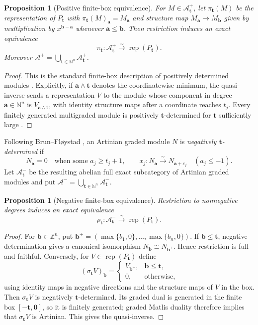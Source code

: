 \documentclass[12pt,reqno]{amsart}
\newtheorem{proposition}[theorem]{Proposition}
\theoremstyle{definition}
\theoremstyle{remark}
\newcommand{\Rep}{\operatorname{rep}}
\begin{document}
\begin{proposition}[Positive finite-box equivalence]\label{prop:positive-box}
For $M\in\mathcal A^+_{\mathbf t}$, let $\pi_{\mathbf t}(M)$ be the
representation of $P_{\mathbf t}$ with
$\pi_{\mathbf t}(M)_{\mathbf a}=M_{\mathbf a}$ and structure map
$M_{\mathbf a}\to M_{\mathbf b}$ given by multiplication by
$x^{\mathbf b-\mathbf a}$ whenever $\mathbf a\le\mathbf b$.
Then restriction induces an exact equivalence
\[
\pi_{\mathbf t}:\mathcal A^+_{\mathbf t}\xrightarrow{\sim}\Rep(P_{\mathbf t}).
\]
Moreover $\mathcal A^+=\bigcup_{\mathbf t\in\mathbb N^n}\mathcal A^+_{\mathbf t}$.
\end{proposition}
\begin{proof}
This is the standard finite-box description of positively determined modules
\cite{BF,Miller}.  Explicitly, if $\mathbf a\wedge\mathbf t$ denotes the
coordinatewise minimum, the quasi-inverse sends a representation $V$ to the
module whose component in degree $\mathbf a\in\mathbb N^n$ is
$V_{\mathbf a\wedge\mathbf t}$, with identity structure maps after a
coordinate reaches $t_j$.  Every finitely generated multigraded module is positively
$\mathbf t$-determined for $\mathbf t$ sufficiently large \cite{Miller}.
\end{proof}

Following Brun--Fl\o ystad \cite[Remark~2.9]{BF}, an Artinian graded module
$N$ is \emph{negatively $\mathbf t$-determined} if
\[
N_{\mathbf a}=0\quad\text{when some }a_j\ge t_j+1,
\qquad
x_j:N_{\mathbf a}\xrightarrow{\sim}N_{\mathbf a+\varepsilon_j}
\quad(a_j\le-1).
\]
Let $\mathcal A^-_{\mathbf t}$ be the resulting abelian full exact subcategory
of Artinian graded modules and put
$\mathcal A^-=\bigcup_{\mathbf t\in\mathbb N^n}\mathcal A^-_{\mathbf t}$.

\begin{proposition}[Negative finite-box equivalence]\label{prop:negative-box}
Restriction to nonnegative degrees induces an exact equivalence
\[
\rho_{\mathbf t}:\mathcal A^-_{\mathbf t}
\xrightarrow{\sim}\Rep(P_{\mathbf t}).
\]
\end{proposition}

\begin{proof}
For $\mathbf b\in\mathbb Z^n$, put
$\mathbf b^+=(\max\{b_1,0\},\ldots,\max\{b_n,0\})$.  If
$\mathbf b\le\mathbf t$, negative determination gives a canonical isomorphism
$N_{\mathbf b}\cong N_{\mathbf b^+}$.  Hence restriction is full
and faithful.  Conversely, for $V\in\Rep(P_{\mathbf t})$ define
\[
(\sigma_{\mathbf t}V)_{\mathbf b}=
\begin{cases}
V_{\mathbf b^+},&\mathbf b\le\mathbf t,\\
0,&\text{otherwise},
\end{cases}
\]
using identity maps in negative directions and the structure maps of $V$ in
the box.  Then $\sigma_{\mathbf t}V$ is negatively $\mathbf t$-determined.
Its graded dual is generated in the finite box $[-\mathbf t,\mathbf0]$, so it
is finitely generated; graded Matlis duality therefore implies that
$\sigma_{\mathbf t}V$ is Artinian.  This gives the quasi-inverse.
\end{proof}
\end{document}
